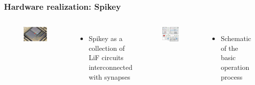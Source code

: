 \documentclass{beamer}
\begin{document}
\begin{frame}
	\frametitle{Hardware realization: Spikey}
	\begin{columns}
          	\begin{figure}
    				\centering
    				\includegraphics[width=\linewidth]{figures/script_spikey_image.png}
 		   \end{figure}
 		   \begin{itemize}
          		\item Spikey as a collection of LiF circuits interconnected with synapses
          	\end{itemize}

          \begin{figure}
    				\centering
    				\includegraphics[width=\linewidth]{figures/script_spikey_schematic.png}
 		   \end{figure}
 		   \begin{itemize}
          		\item Schematic of the basic operation process
          	\end{itemize}

	\end{columns}
\end{frame}
\end{document}
